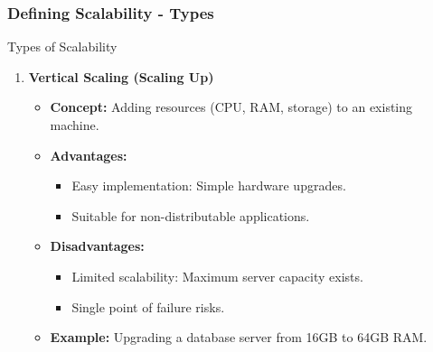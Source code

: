 \documentclass[aspectratio=169]{beamer}
\begin{document}
\begin{frame}[fragile]
    \frametitle{Defining Scalability - Types}
    \begin{block}{Types of Scalability}
        \begin{enumerate}
            \item \textbf{Vertical Scaling (Scaling Up)}
                \begin{itemize}
                    \item \textbf{Concept:} Adding resources (CPU, RAM, storage) to an existing machine.
                    \item \textbf{Advantages:}
                        \begin{itemize}
                            \item Easy implementation: Simple hardware upgrades.
                            \item Suitable for non-distributable applications.
                        \end{itemize}
                    \item \textbf{Disadvantages:}
                        \begin{itemize}
                            \item Limited scalability: Maximum server capacity exists.
                            \item Single point of failure risks.
                        \end{itemize}
                    \item \textbf{Example:} Upgrading a database server from 16GB to 64GB RAM.
                \end{itemize}


\end{enumerate}
\end{block}
\end{frame}
\end{document}
